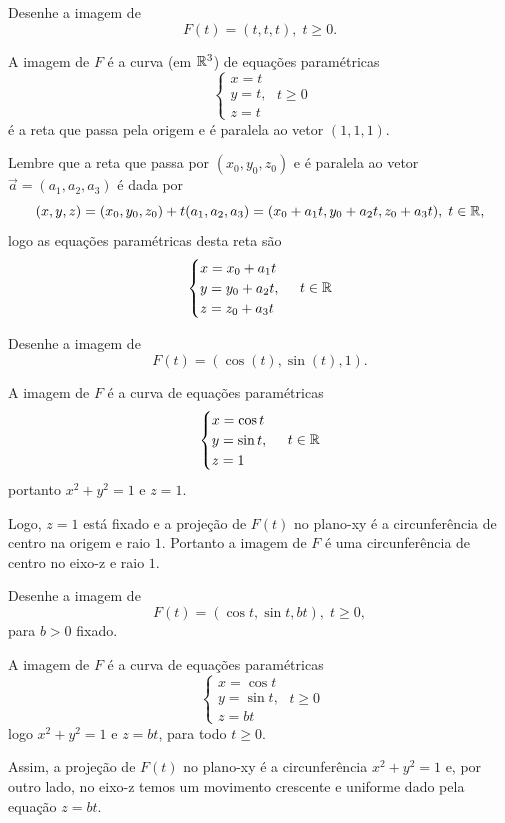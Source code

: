\begin{example}
    Desenhe a imagem de \[F(t) = (t,t,t),\; t\geq 0.\]

    A imagem de \(F\) é a curva (em \(\mathbb{R}^3\)) de equações paramétricas \[\begin{cases}
        x = t\\
        y = t,\\
        z = t
    \end{cases}\; t\geq 0\] é a reta que passa pela origem e é paralela ao vetor \((1,1,1)\).%

    Lembre que a reta que passa por \((x_0,y_0,z_0)\) e é paralela ao vetor \(\overrightarrow{a} = (a_1,a_2,a_3)\) é dada por \[(x,y,z) = (x_0,y_0,z_0) + t(a_1,a_2,a_3) = (x_0 + a_1 t, y_0 + a_2 t, z_0 + a_3 t),\; t\in\mathbb{R},\] logo as equações paramétricas desta reta são \[\begin{cases}
        x = x_0 + a_1 t \\
        y = y_0 + a_2 t, \\
        z = z_0 + a_3 t
    \end{cases}\; t\in\mathbb{R}\]
\end{example}

\begin{example}
    Desenhe a imagem de \[F(t) = (\cos(t),\sin(t),1).\]

    A imagem de \(F\) é a curva de equações paramétricas \[\begin{cases}
        x = \cos t \\
        y = \sin t, \\
        z = 1
    \end{cases}\; t\in \mathbb{R}\] portanto \(x^2 + y^2 = 1\) e \(z = 1\).

    Logo, \(z=1\) está fixado e a projeção de \(F(t)\) no plano-xy é a circunferência de centro na origem e raio \(1\). Portanto a imagem de \(F\) é uma circunferência de centro no eixo-z e raio \(1\). %
\end{example}

\begin{example}
    Desenhe a imagem de \[F(t) = (\cos t, \sin t, bt),\; t\geq 0,\] para \(b>0\) fixado.

    A imagem de \(F\) é a curva de equações paramétricas \[\begin{cases}
        x = \cos t \\
        y = \sin t,\\
        z = bt
    \end{cases}\; t\geq 0\] logo \(x^2 + y^2 = 1\) e \(z = bt\), para todo \(t\geq 0\).

    Assim, a projeção de \(F(t)\) no plano-xy é a circunferência \(x^2 + y^2 = 1\) e, por outro lado, no eixo-z temos um movimento crescente e uniforme dado pela equação \(z = bt\). %
\end{example}

